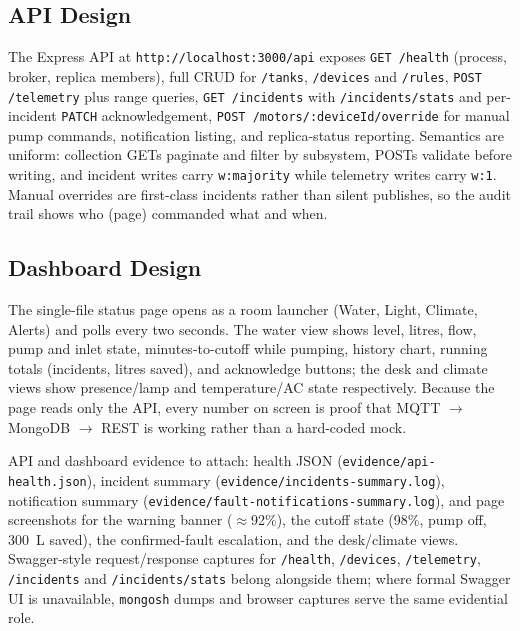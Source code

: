 \documentclass[11pt,a4paper]{article}
\begin{document}
\subsection{API Design}

The Express API at \texttt{http://localhost:3000/api} exposes \texttt{GET /health} (process, broker, replica members), full CRUD for \texttt{/tanks}, \texttt{/devices} and \texttt{/rules}, \texttt{POST /telemetry} plus range queries, \texttt{GET /incidents} with \texttt{/incidents/stats} and per-incident \texttt{PATCH} acknowledgement, \texttt{POST /motors/:deviceId/override} for manual pump commands, notification listing, and replica-status reporting. Semantics are uniform: collection GETs paginate and filter by subsystem, POSTs validate before writing, and incident writes carry \texttt{w:majority} while telemetry writes carry \texttt{w:1}. Manual overrides are first-class incidents rather than silent publishes, so the audit trail shows who (page) commanded what and when.

\subsection{Dashboard Design}

The single-file status page opens as a room launcher (Water, Light, Climate, Alerts) and polls every two seconds. The water view shows level, litres, flow, pump and inlet state, minutes-to-cutoff while pumping, history chart, running totals (incidents, litres saved), and acknowledge buttons; the desk and climate views show presence/lamp and temperature/AC state respectively. Because the page reads only the API, every number on screen is proof that MQTT $\rightarrow$ MongoDB $\rightarrow$ REST is working rather than a hard-coded mock.

API and dashboard evidence to attach: health JSON (\texttt{evidence/api-health.json}), incident summary (\texttt{evidence/incidents-summary.log}), notification summary (\texttt{evidence/fault-notifications-summary.log}), and page screenshots for the warning banner ($\approx$92\%), the cutoff state (98\%, pump off, 300~L saved), the confirmed-fault escalation, and the desk/climate views. Swagger-style request/response captures for \texttt{/health}, \texttt{/devices}, \texttt{/telemetry}, \texttt{/incidents} and \texttt{/incidents/stats} belong alongside them; where formal Swagger UI is unavailable, \texttt{mongosh} dumps and browser captures serve the same evidential role.

\end{document}
